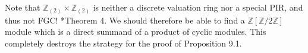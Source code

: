 \documentclass[11pt]{amsart}
\theoremstyle{plain}
\newcommand{\ZZ}{{\mathbb{Z}}}
\begin{document}
Note that $\ZZ_{(2)} \times \ZZ_{(2)}$ is neither a discrete valuation ring nor a special PIR, and thus not FGC! \cite{Warfield:Decomposability}*{Theorem 4}.  We should therefore be able to find a $\ZZ[\ZZ/2\ZZ]$ module which is a direct summand of a product of cyclic modules.  This completely destroys the strategy for the proof of Proposition 9.1.


\end{document}
